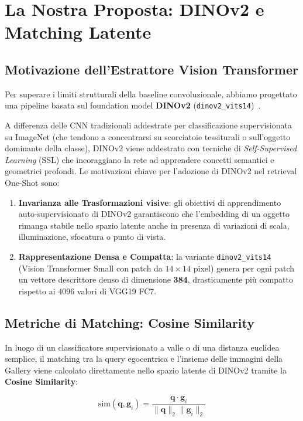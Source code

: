 \documentclass[a4paper,12pt]{report}
\begin{document}
\section{La Nostra Proposta: DINOv2 e Matching Latente}

\subsection{Motivazione dell'Estrattore Vision Transformer}

Per superare i limiti strutturali della baseline convoluzionale, abbiamo progettato una pipeline basata sul foundation model \textbf{DINOv2} (\texttt{dinov2\_vits14})~\cite{dinov2}. 

A differenza delle CNN tradizionali addestrate per classificazione supervisionata su ImageNet (che tendono a concentrarsi su scorciatoie tessiturali o sull'oggetto dominante della classe), DINOv2 viene addestrato con tecniche di \emph{Self-Supervised Learning} (SSL) che incoraggiano la rete ad apprendere concetti semantici e geometrici profondi. Le motivazioni chiave per l'adozione di DINOv2 nel retrieval One-Shot sono:

\begin{enumerate}
    \item \textbf{Invarianza alle Trasformazioni visive}: gli obiettivi di apprendimento auto-supervisionato di DINOv2 garantiscono che l'embedding di un oggetto rimanga stabile nello spazio latente anche in presenza di variazioni di scala, illuminazione, sfocatura o punto di vista.
    \item \textbf{Rappresentazione Densa e Compatta}: la variante \texttt{dinov2\_vits14} (Vision Transformer Small con patch da $14 \times 14$ pixel) genera per ogni patch un vettore descrittore denso di dimensione \textbf{384}, drasticamente più compatto rispetto ai 4096 valori di VGG19 FC7.
\end{enumerate}

\subsection{Metriche di Matching: Cosine Similarity}

In luogo di un classificatore supervisionato a valle o di una distanza euclidea semplice, il matching tra la query egocentrica e l'insieme delle immagini della Gallery viene calcolato direttamente nello spazio latente di DINOv2 tramite la \textbf{Cosine Similarity}:

\begin{equation}
\text{sim}(\mathbf{q}, \mathbf{g}_i) = \frac{\mathbf{q} \cdot \mathbf{g}_i}{\|\mathbf{q}\|_2 \|\mathbf{g}_i\|_2}
\end{equation}
\end{document}
